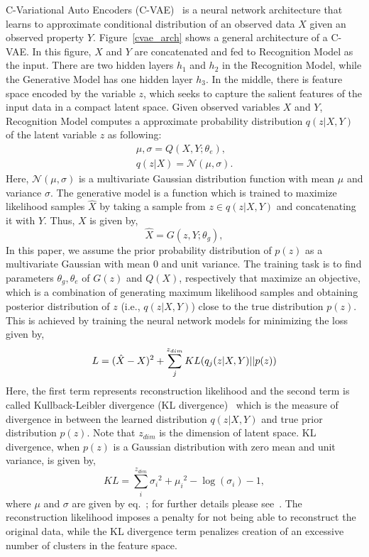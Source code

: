 C-Variational Auto Encoders (C-VAE)~\cite{Kingma2014AutoEncodingVB} is a neural network architecture that learns to approximate conditional distribution of an observed data $X$ given an observed property $Y$.
Figure~\ref{cvae_arch} shows a general architecture of a C-VAE.
In this figure, $X$ and $Y$ are concatenated and fed to Recognition Model as the input. There are two hidden layers $h_1$ and $h_2$ in the Recognition Model, while the Generative Model has one hidden layer $h_3$. In the middle, there is feature space encoded by the variable $z$, which seeks to capture the salient features of the input data in a compact latent space.
Given observed variables $X$ and $Y$, Recognition Model computes a approximate probability distribution $q(z|X, Y)$ of the latent variable $z$ as following:
\begin{eqnarray}\label{eq_Q_cvae}
\mu, \sigma = Q(X, Y; \theta_e),\\
  q(z|X) = \mathcal{N}(\mu, \sigma).\label{eq_Q_2}
\end{eqnarray}
Here, $\mathcal{N}(\mu, \sigma)$ is a multivariate Gaussian distribution function with mean $\mu$ and variance $\sigma$.
The generative model is a function which is trained to maximize likelihood samples $\hat{X}$ by taking a sample from $z \in q(z|X, Y)$ and concatenating it with $Y$. Thus, $X$ is given by,
\begin{equation}\label{eq_cvae}
  \hat{X} = G(z, Y; \theta_g),
\end{equation}
In this paper, we assume the prior probability distribution of $p(z)$ as a multivariate Gaussian with mean 0 and unit variance.
The training task is to find parameters $\theta_g, \theta_e $ of $G(z)$ and $Q(X)$, respectively that maximize an objective, which is a combination of generating maximum likelihood samples and obtaining posterior distribution of $z$ (i.e., $q(z|X, Y)$) close to the true distribution $p(z)$.
This is achieved by training the neural network models for minimizing the loss given by,
\begin{equation}
  L = (\hat{X}-X)^2 + \sum_j^{z_{dim}} KL(q_j(z|X, Y)||p(z)) \\
\end{equation}
Here, the first term represents reconstruction likelihood and the second term is called Kullback-Leibler divergence (KL divergence)~\cite{kullback1951} which is the measure of divergence in between the learned distribution $q(z| X, Y)$ and true prior distribution $p(z)$. Note that $z_{dim}$ is the dimension of latent space.
KL divergence, when $p(z)$ is a Gaussian distribution with zero mean and unit variance, is given by,
\begin{equation}
  KL = \sum_i^{z_{dim}} {\sigma_i}^2 + {\mu_i}^2 - \log(\sigma_i) - 1,
\end{equation}
where $\mu$ and $\sigma$ are given by eq.~; for further details please see~\cite{Kingma2014AutoEncodingVB}. The reconstruction likelihood imposes a penalty for not being able to reconstruct the original data, while the KL divergence term penalizes creation of an excessive number of clusters in the feature space.

